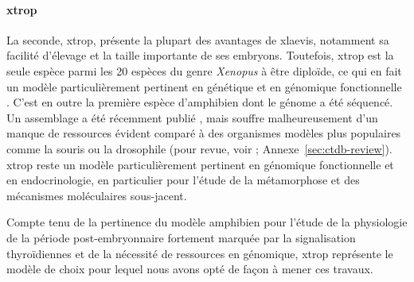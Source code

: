 \documentclass[../main.tex]{subfiles}
\begin{document}
\paragraph{\gls{xtrop}}
La seconde, \gls{xtrop}, présente la plupart des avantages de \gls{xlaevis}, notamment sa facilité d'élevage et la taille importante de ses embryons.
Toutefois, \gls{xtrop} est la seule espèce parmi les 20 espèces du genre \textit{Xenopus} à être diploïde, ce qui en fait un modèle particulièrement pertinent en génétique et en génomique fonctionnelle \citep{Amaya2005}.
C'est en outre la première espèce d'amphibien dont le génome a été séquencé.
Un assemblage a été récemment publié \citep{Hellsten2010a}, mais souffre malheureusement d'un manque de ressources évident comparé à des organismes modèles plus populaires comme la souris ou la drosophile (pour revue, voir \citet{Grimaldi2013}; Annexe~\ref{sec:ctdb-review}).
\gls{xtrop} reste un modèle particulièrement pertinent en génomique fonctionnelle et en endocrinologie, en particulier pour l'étude de la métamorphose et des mécanismes moléculaires sous-jacent.
\par
Compte tenu de la pertinence du modèle amphibien pour l'étude de la physiologie de la période post-embryonnaire fortement marquée par la signalisation thyroïdiennes et de la nécessité de ressources en génomique, \gls{xtrop} représente le modèle de choix pour lequel nous avons opté de façon à mener ces travaux.

\end{document}
